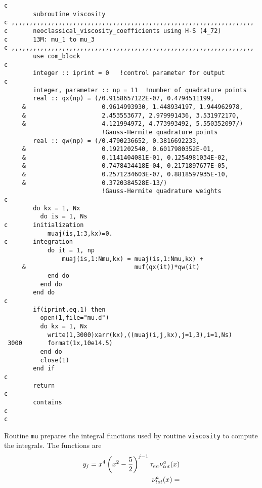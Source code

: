 \begin{verbatim}
c
        subroutine viscosity
c ,,,,,,,,,,,,,,,,,,,,,,,,,,,,,,,,,,,,,,,,,,,,,,,,,,,,,,,,,,,,,,,,,,,
c       neoclassical_viscosity_coefficients using H-S (4_72)
c       13M: mu_1 to mu_3
c ,,,,,,,,,,,,,,,,,,,,,,,,,,,,,,,,,,,,,,,,,,,,,,,,,,,,,,,,,,,,,,,,,,,
        use com_block
c
        integer :: iprint = 0   !control parameter for output
c
        integer, parameter :: np = 11  !number of quadrature points
        real :: qx(np) = (/0.9158657122E-07, 0.4794511199,
     &                     0.9614993930, 1.448934197, 1.944962978,
     &                     2.453553677, 2.979991436, 3.531972170,
     &                     4.121994972, 4.773993492, 5.550352097/)
                           !Gauss-Hermite quadrature points
        real :: qw(np) = (/0.4790236652, 0.3816692233,
     &                     0.1921202540, 0.6017980352E-01,
     &                     0.1141404081E-01, 0.1254981034E-02,
     &                     0.7478434418E-04, 0.2171897677E-05,
     &                     0.2571234603E-07, 0.8818597935E-10,
     &                     0.3720384528E-13/)
                           !Gauss-Hermite quadrature weights
c
        do kx = 1, Nx
          do is = 1, Ns
c       initialization
            muaj(is,1:3,kx)=0.
c       integration
            do it = 1, np
                muaj(is,1:Nmu,kx) = muaj(is,1:Nmu,kx) +
     &                              muf(qx(it))*qw(it)
            end do
          end do
        end do
c
        if(iprint.eq.1) then
          open(1,file="mu.d")
          do kx = 1, Nx
            write(1,3000)xarr(kx),((muaj(i,j,kx),j=1,3),i=1,Ns)
 3000       format(1x,10e14.5)
          end do
          close(1)
        end if
c
        return
c
        contains
c
c
\end{verbatim}
Routine {\tt mu} prepares the integral functions used by routine {\tt viscosity} to compute the integrals. The functions are
\begin{eqnarray}
y_j=x^4\left(x^2-{5\over 2}\right)^{j-1}\tau_{aa}\nu_{tot}^a(x)\\
\nu_{tot}^a(x)=
\end{eqnarray}
